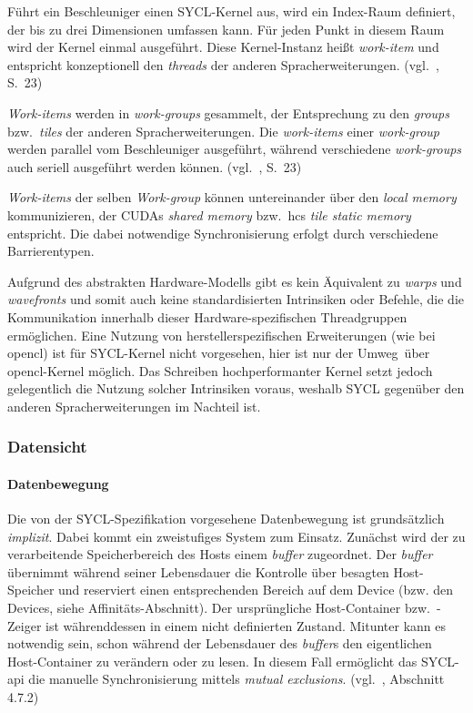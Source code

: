 Führt ein Beschleuniger einen SYCL-Kernel aus, wird ein Index-Raum definiert,
der bis zu drei Dimensionen umfassen kann. Für jeden Punkt in diesem Raum wird
der Kernel einmal ausgeführt. Diese Kernel-Instanz heißt \textit{work-item} und
entspricht konzeptionell den \textit{threads} der anderen Spracherweiterungen.
(vgl.~\cite{syclspec}, S.\ 23)

\textit{Work-items} werden in \textit{work-groups} gesammelt, der Entsprechung
zu den \textit{groups} bzw.\ \textit{tiles} der anderen Spracherweiterungen.
Die \textit{work-items} einer \textit{work-group} werden parallel vom
Beschleuniger ausgeführt, während verschiedene \textit{work-groups} auch seriell
ausgeführt werden können.
(vgl.~\cite{syclspec}, S.\ 23)

\textit{Work-items} der selben \textit{Work-group} können untereinander über
den \textit{local memory} kommunizieren, der CUDAs \textit{shared memory} bzw.\
\gls{hc}s \textit{tile static memory} entspricht. Die dabei notwendige
Synchronisierung erfolgt durch verschiedene Barrierentypen.

Aufgrund des abstrakten Hardware-Modells gibt es kein Äquivalent zu
\textit{warps} und \textit{wavefronts} und somit auch keine standardisierten
Intrinsiken oder Befehle, die die Kommunikation innerhalb dieser
Hardware-spezifischen Threadgruppen ermöglichen. Eine Nutzung von
herstellerspezifischen Erweiterungen (wie bei \gls{opencl}) ist für SYCL-Kernel
nicht vorgesehen, hier ist nur der \glqq Umweg\grqq\ über \gls{opencl}-Kernel
möglich. Das Schreiben hochperformanter Kernel setzt jedoch gelegentlich die
Nutzung solcher Intrinsiken voraus, weshalb SYCL gegenüber den anderen
Spracherweiterungen im Nachteil ist.

\subsubsection{Datensicht}

\paragraph{Datenbewegung}

Die von der SYCL-Spezifikation vorgesehene Datenbewegung ist grundsätzlich
\textit{implizit}. Dabei kommt ein zweistufiges System zum Einsatz. Zunächst
wird der zu verarbeitende Speicherbereich des Hosts einem \textit{buffer}
zugeordnet. Der \textit{buffer} übernimmt während seiner Lebensdauer die
Kontrolle über besagten Host-Speicher und reserviert einen entsprechenden
Bereich auf dem Device (bzw. den Devices, siehe Affinitäts-Abschnitt). Der
ursprüngliche Host-Container bzw.\ -Zeiger ist währenddessen in einem nicht
definierten Zustand. Mitunter kann es notwendig sein, schon während der
Lebensdauer des \textit{buffer}s den eigentlichen Host-Container zu verändern
oder zu lesen. In diesem Fall ermöglicht das SYCL-\gls{api} die manuelle
Synchronisierung mittels \textit{mutual exclusions}.
(vgl.~\cite{syclspec}, Abschnitt 4.7.2)

